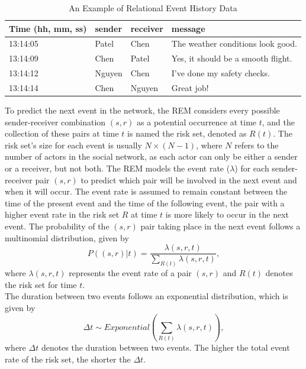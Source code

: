 \documentclass[]{interact}
\theoremstyle{plain}%
\theoremstyle{definition}
\theoremstyle{remark}
\begin{document}
{	\begin{table}[h]
		\centering
		\renewcommand{\arraystretch}{1.1} %
		\small
		\begin{tabular}{llll}
			\hline
			Time (hh,  mm, ss) & sender & receiver & message                                  \\ \hline
			13:14:05           & Patel  & Chen     & The weather conditions look good.        \\
			13:14:09           & Chen   & Patel    & Yes, it should be a smooth flight.       \\
			13:14:12           & Nguyen & Chen     & I've done my safety checks.              \\
			13:14:14           & Chen   & Nguyen   & Great job!                               \\ \hline
		\end{tabular}
		\caption{An Example of Relational Event History Data}
		\label{Table 1}
	\end{table}
	
	To predict the next event in the network, the REM considers every possible sender-receiver combination $(s,r)$ as a potential occurrence at time $t$, and the collection of these pairs at time $t$ is named the risk set, denoted as $R(t)$. The risk set's size for each event is usually $N \times (N-1)$, where $N$ refers to the number of actors in the social network, as each actor can only be either a sender or a receiver, but not both. The REM models the event rate ($\lambda$) for each sender-receiver pair $(s,r)$ to predict which pair will be involved in the next event and when it will occur. The event rate is assumed to remain constant between the time of the present event and the time of the following event, the pair with a higher event rate in the risk set $R$ at time $t$ is more likely to occur in the next event. The probability of the $(s,r)$ pair taking place in the next event follows a multinomial distribution, given by
	\begin{equation} \label{1}
		P \left((s,r) | t \right) = \dfrac{\lambda(s,r,t)} {\sum_{R(t)} \lambda(s,r,t)},
	\end{equation}
	where $\lambda(s,r,t)$ represents the event rate of a pair $(s,r)$ and $R(t)$ denotes the risk set for time $t$. \\
	
	The duration between two events follows an exponential distribution, which is given by
	\begin{equation} \label{2}
		\Delta t \sim Exponential \left(\sum_{R(t)} \lambda(s,r,t) \right),
	\end{equation}
	where $\Delta t$ denotes the duration between two events. The higher the total event rate of the risk set, the shorter the $\Delta t$. \\
	
}
\end{document}
